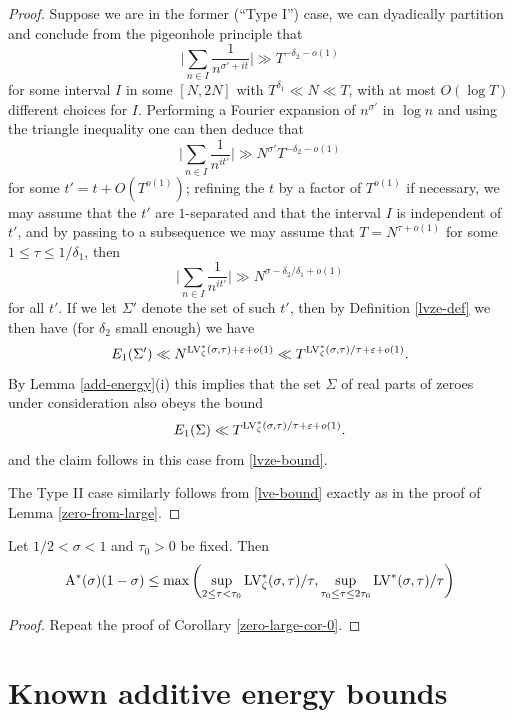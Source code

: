 \begin{proof}
Suppose we are in the former (``Type I'') case, we can dyadically partition and conclude from the pigeonhole principle that
$$ \bigg| \sum_{n \in I} \frac{1}{n^{\sigma'+it}} \bigg| \gg T^{-\delta_2-o(1)}$$
for some interval $I$ in some $[N,2N]$ with $T^{\delta_1} \ll N \ll T$, with at most $O(\log T)$ different choices for $I$.  Performing a Fourier expansion of $n^{\sigma'}$ in $\log n$ and using the triangle inequality one can then deduce that
$$ \bigg| \sum_{n \in I} \frac{1}{n^{it'}} \bigg| \gg N^{\sigma'} T^{-\delta_2-o(1)}$$
for some $t' = t + O(T^{o(1)})$; refining the $t$ by a factor of $T^{o(1)}$ if necessary, we may assume that the $t'$ are $1$-separated and that the interval $I$ is independent of $t'$, and by passing to a subsequence we may assume that $T = N^{\tau+o(1)}$ for some $1 \leq \tau \leq 1/\delta_1$, then
$$ \bigg| \sum_{n \in I} \frac{1}{n^{it'}} \bigg| \gg N^{\sigma-\delta_2/\delta_1+o(1)}$$
for all $t'$.  If we let $\Sigma'$ denote the set of such $t'$, then by Definition \ref{lvze-def} we then have (for $\delta_2$ small enough) we have
$$ E_1(\Sigma') \ll N^{\mathrm{LV}^*_\zeta(\sigma,\tau) + \varepsilon + o(1)} \ll T^{\mathrm{LV}^*_\zeta(\sigma,\tau)/\tau + \varepsilon + o(1)}.$$
By Lemma \ref{add-energy}(i) this implies that the set $\Sigma$ of real parts of zeroes under consideration also obeys the bound
$$ E_1(\Sigma) \ll T^{\mathrm{LV}^*_\zeta(\sigma,\tau)/\tau + \varepsilon + o(1)}.$$
and the claim follows in this case from \eqref{lvze-bound}.

The Type II case similarly follows from \eqref{lve-bound} exactly as in the proof of Lemma \ref{zero-from-large}.
\end{proof}


\begin{corollary}\label{zeroe-large-cor-0} Let $1/2 < \sigma < 1$ and $\tau_0 > 0$ be fixed.  Then
$$ \mathrm{A}^*(\sigma)(1-\sigma) \leq \max \left(\sup_{2 \leq \tau < \tau_0} \mathrm{LV}^*_\zeta(\sigma,\tau)/\tau, \sup_{\tau_0 \leq \tau \leq 2\tau_0} \mathrm{LV}^*(\sigma,\tau)/\tau\right)$$
\end{corollary}


\begin{proof}  Repeat the proof of Corollary \ref{zero-large-cor-0}.
\end{proof}

\section{Known additive energy bounds}

